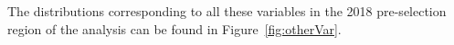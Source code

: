 \documentclass[a4paper, 10pt, openright]{report}
\begin{document}
\begin{itemize}
%
\end{itemize}

The distributions corresponding to all these variables in the 2018 pre-selection region of the analysis can be found in Figure~\ref{fig:otherVar}.
\end{document}

